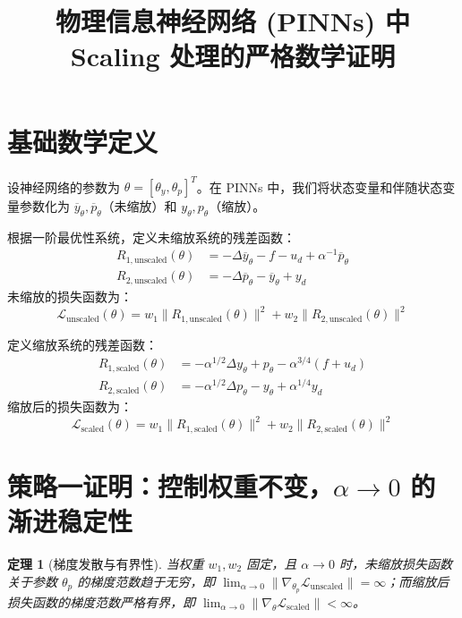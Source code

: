 \documentclass[a4paper, 11pt]{ctexart}
\title{物理信息神经网络 (PINNs) 中 Scaling 处理的严格数学证明}
\author{}
\date{}
\newtheorem{theorem}{定理}
\begin{document}
\maketitle

\section{基础数学定义}

设神经网络的参数为 $\theta = [\theta_y, \theta_p]^T$。在 PINNs 中，我们将状态变量和伴随状态变量参数化为 $\overline{y}_\theta, \overline{p}_\theta$（未缩放）和 $y_\theta, p_\theta$（缩放）。

根据一阶最优性系统，定义未缩放系统的残差函数：
\begin{align}
    R_{1, \text{unscaled}}(\theta) &= -\Delta\overline{y}_\theta - f - u_d + \alpha^{-1}\overline{p}_\theta \\
    R_{2, \text{unscaled}}(\theta) &= -\Delta\overline{p}_\theta - \overline{y}_\theta + y_d
\end{align}
未缩放的损失函数为：
\begin{equation}
    \mathcal{L}_{\text{unscaled}}(\theta) = w_1 \|R_{1, \text{unscaled}}(\theta)\|^2 + w_2 \|R_{2, \text{unscaled}}(\theta)\|^2
\end{equation}

定义缩放系统的残差函数：
\begin{align}
    R_{1, \text{scaled}}(\theta) &= -\alpha^{1/2}\Delta y_\theta + p_\theta - \alpha^{3/4}(f + u_d) \\
    R_{2, \text{scaled}}(\theta) &= -\alpha^{1/2}\Delta p_\theta - y_\theta + \alpha^{1/4}y_d
\end{align}
缩放后的损失函数为：
\begin{equation}
    \mathcal{L}_{\text{scaled}}(\theta) = w_1 \|R_{1, \text{scaled}}(\theta)\|^2 + w_2 \|R_{2, \text{scaled}}(\theta)\|^2
\end{equation}

\section{策略一证明：控制权重不变，$\alpha \to 0$ 的渐进稳定性}

\begin{theorem}[梯度发散与有界性]
当权重 $w_1, w_2$ 固定，且 $\alpha \to 0$ 时，未缩放损失函数关于参数 $\theta_p$ 的梯度范数趋于无穷，即 $\lim_{\alpha \to 0} \|\nabla_{\theta_p} \mathcal{L}_{\text{unscaled}}\| = \infty$；而缩放后损失函数的梯度范数严格有界，即 $\lim_{\alpha \to 0} \|\nabla_{\theta} \mathcal{L}_{\text{scaled}}\| < \infty$。
\end{theorem}
\end{document}
